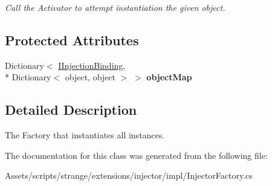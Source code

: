 \begin{DoxyCompactItemize}
\begin{DoxyCompactList}\small\item\em Call the Activator to attempt instantiation the given object. \end{DoxyCompactList}\end{DoxyCompactItemize}
\subsection*{Protected Attributes}
\begin{DoxyCompactItemize}
\item 
\hypertarget{classstrange_1_1extensions_1_1injector_1_1impl_1_1_injector_factory_a41ff79c05399567b47029445189c8d30}{Dictionary$<$ \hyperlink{interfacestrange_1_1extensions_1_1injector_1_1api_1_1_i_injection_binding}{I\-Injection\-Binding}, \\*
Dictionary$<$ object, object $>$ $>$ {\bfseries object\-Map}}\label{classstrange_1_1extensions_1_1injector_1_1impl_1_1_injector_factory_a41ff79c05399567b47029445189c8d30}

\end{DoxyCompactItemize}


\subsection{Detailed Description}
The Factory that instantiates all instances. 

The documentation for this class was generated from the following file\-:\begin{DoxyCompactItemize}
\item 
Assets/scripts/strange/extensions/injector/impl/Injector\-Factory.\-cs\end{DoxyCompactItemize}
